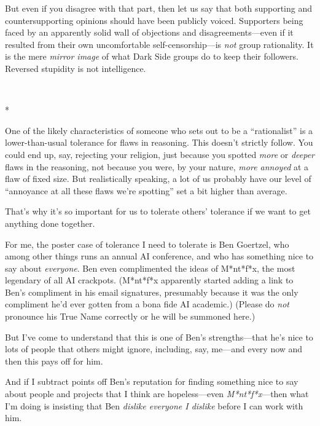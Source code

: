 {
 But even if you disagree with that part, then let us say that both
supporting and countersupporting opinions should have been publicly
voiced. Supporters being faced by an apparently solid wall of
objections and disagreements---even if it resulted from their own
uncomfortable self-censorship---is \textit{not} group rationality. It
is the mere \textit{mirror image} of what Dark Side groups do to keep
their followers. Reversed stupidity is not intelligence.}

{\centering
 \ ~
\par}

{\centering
 *
\par}


{
 One of the likely characteristics of someone who sets out to be a
``rationalist'' is a
lower-than-usual tolerance for flaws in reasoning. This
doesn't strictly follow. You could end up, say,
rejecting your religion, just because you spotted \textit{more} or
\textit{deeper} flaws in the reasoning, not because you were, by your
nature, \textit{more annoyed} at a flaw of fixed size. But
realistically speaking, a lot of us probably have our level of
``annoyance at all these flaws we're
spotting'' set a bit higher than average. }

{
 That's why it's so important for
us to tolerate others' tolerance if we want to get
anything done together.}

{
 For me, the poster case of tolerance I need to tolerate is Ben
Goertzel, who among other things runs an annual AI conference, and who
has something nice to say about \textit{everyone}. Ben even
complimented the ideas of M*nt*f*x, the most legendary of all AI
crackpots. (M*nt*f*x apparently started adding a link to
Ben's compliment in his email signatures, presumably
because it was the only compliment he'd ever gotten
from a bona fide AI academic.) (Please do \textit{not} pronounce his
True Name correctly or he will be summoned here.)}

{
 But I've come to understand that this is one of
Ben's strengths---that he's nice to
lots of people that others might ignore, including, say, me---and every
now and then this pays off for him.}

{
 And if I subtract points off Ben's reputation for
finding something nice to say about people and projects that I think
are hopeless---even \textit{M*nt*f*x}{}---then what I'm
doing is insisting that Ben \textit{dislike everyone I dislike} before
I can work with him.}

